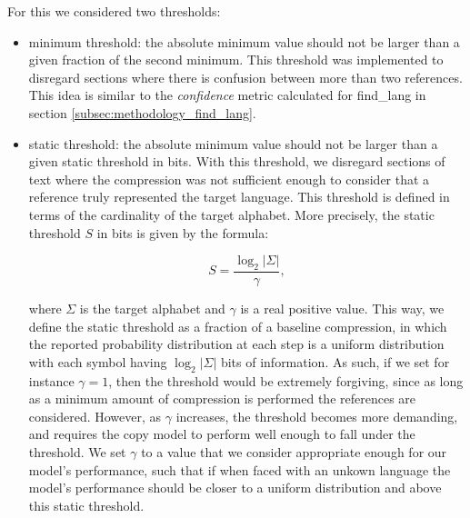 \documentclass{article}
\begin{document}
For this we considered two thresholds:
\begin{itemize}
    \item minimum threshold: the absolute minimum value should not be larger than a given fraction of the second minimum. This threshold was implemented to disregard sections where there is confusion between more than two references. This idea is similar to the \textit{confidence} metric calculated for find_lang in section \ref{subsec:methodology_find_lang}.
    \item static threshold: the absolute minimum value should not be larger than a given static threshold in bits. With this threshold, we disregard sections of text where the compression was not sufficient enough to consider that a reference truly represented the target language.
    This threshold is defined in terms of the cardinality of the target alphabet.
    More precisely, the static threshold $S$ in bits is given by the formula:

    $$
    S = \frac{\log_2 |\Sigma|}{\gamma},
    $$

    where $\Sigma$ is the target alphabet and $\gamma$ is a real positive value.
    This way, we define the static threshold as a fraction of a baseline compression, in which the reported probability distribution at each step is a uniform distribution with each symbol having $\log_2 |\Sigma|$ bits of information.
    As such, if we set for instance $\gamma = 1$, then the threshold would be extremely forgiving, since as long as a minimum amount of compression is performed the references are considered.
    However, as $\gamma$ increases, the threshold becomes more demanding, and requires the copy model to perform well enough to fall under the threshold.
    We set $\gamma$ to a value that we consider appropriate enough for our model's performance, such that if when faced with an unkown language the model's performance should be closer to a uniform distribution and above this static threshold.
\end{itemize}
\end{document}

